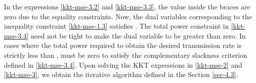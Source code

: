 In the expressions \eqref{kkt-mse-3.2} and \eqref{kkt-mse-3.3}, the value inside the braces are zero due to the equality constraints. Now, the dual variables corresponding to the inequality constraint \eqref{kkt-mse-1.3} satisfies . The total power constraint in \eqref{kkt-mse-3.4} need not be tight to make the dual variable  to be greater than zero. In cases where the total power required to obtain the desired transmission rate is strictly less than ,  must be zero to satisfy the complementary slackness criterion defined in \eqref{kkt-mse-3.4}. Upon solving the \ac{KKT} expressions in \eqref{kkt-mse-2} and \eqref{kkt-mse-3}, we obtain the iterative algorithm defined in the Section \ref{sec-4.3}.
